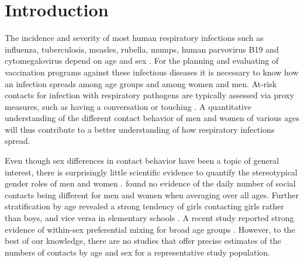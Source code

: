 \documentclass[aoas,preprint]{imsart}
\numberwithin{equation}{section}
\begin{document}
\begin{frontmatter}
\begin{keyword}
\end{keyword}

\end{frontmatter}

\section{Introduction}

The incidence and severity of most human respiratory infections such as influenza, tuberculosis, measles, rubella, mumps, human parvovirus B19 and cytomegalovirus depend on age and sex \citep{falagas_sex_2007, klein_impact_2010, holmes_review_1998, borgdorff_gender_2000, neyrolles_sexual_2009, brown_sex_2010, davis_increasing_2010, young_parvovirus_2004, pass_vaccine_2009}. For the planning and evaluating of vaccination programs against these infectious diseases it is necessary to know how an infection spreads among age groups and among women and men. At-risk contacts for infection with respiratory pathogens are typically assessed via proxy measures, such as having a conversation or touching \citep{edmunds_who_1997, wallinga_using_2006, mossong_social_2008, kucharski_contribution_2014}. A quantitative understanding of the different contact behavior of men and women of various ages will thus contribute to a better understanding of how respiratory infections spread.

Even though sex differences in contact behavior have been a topic of general interest, there is surprisingly little scientific evidence to quantify the stereotypical gender roles of men and women \citep{mehl_are_2007}. \citet{mossong_social_2008} found no evidence of the daily number of social contacts being different for men and women when averaging over all ages. Further stratification by age revealed a strong tendency of girls contacting girls rather than boys, and vice versa in elementary schools \citep{cauchemez_role_2011, conlan_measuring_2011}. A recent study reported strong evidence of within-sex preferential mixing for broad age groups \citep{dodd_age-_2016}. However, to the best of our knowledge, there are no studies that offer precise estimates of the numbers of contacts by age and sex for a representative study population.
\end{document}
